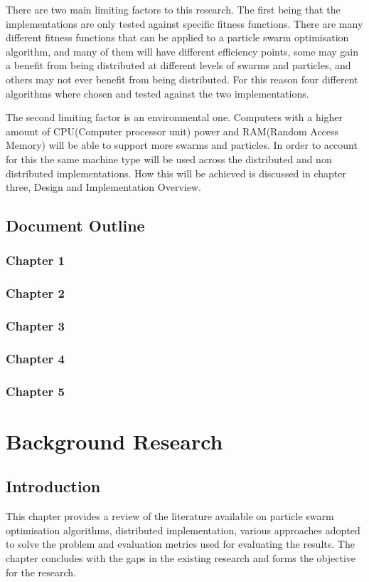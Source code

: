 \documentclass[oneside,12pt]{book}
\begin{document}
There are two main limiting factors to this research. The first being that the implementations are only tested against specific fitness functions. There are many different fitness functions that can be applied to a particle swarm optimisation algorithm, and many of them will have different efficiency points, some may gain a benefit from being distributed at different levels of swarms and particles, and others may not ever benefit from being distributed. For this reason four different algorithms where chosen and tested against the two implementations. 

The second limiting factor is an environmental one. Computers with a higher amount of CPU(Computer processor unit) power and RAM(Random Access Memory) will be able to support more swarms and particles. In order to account for this the same machine type will be used across the distributed and non distributed implementations. How this will be achieved is discussed in chapter three, Design and Implementation Overview. 

\section{Document Outline}
\subsection{Chapter 1}
\subsection{Chapter 2}
\subsection{Chapter 3}
\subsection{Chapter 4}
\subsection{Chapter 5}

\chapter{Background Research}
\section{Introduction}
This  chapter  provides  a  review of the  literature available on particle swarm optimisation algorithms, distributed implementation, various  approaches adopted  to  solve  the  problem  and  evaluation metrics used  for  evaluating  the results.  The  chapter  concludes with  the  gaps  in  the existing research and forms the objective for the research.
\end{document}
